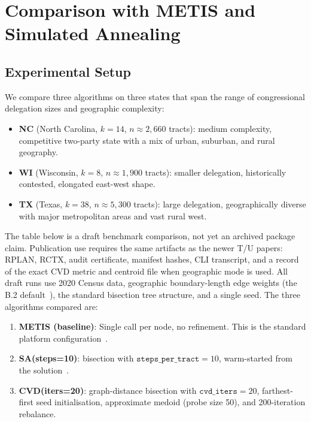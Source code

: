 \section{Comparison with METIS and Simulated Annealing}
\label{sec:comparison}

\subsection{Experimental Setup}

We compare three algorithms on three states that span the range of
congressional delegation sizes and geographic complexity:
\begin{itemize}
\item \textbf{NC} (North Carolina, $k=14$, $n \approx 2{,}660$ tracts):
  medium complexity, competitive two-party state with a mix of urban,
  suburban, and rural geography.
\item \textbf{WI} (Wisconsin, $k=8$, $n \approx 1{,}900$ tracts):
  smaller delegation, historically contested, elongated east-west shape.
\item \textbf{TX} (Texas, $k=38$, $n \approx 5{,}300$ tracts):
  large delegation, geographically diverse with major metropolitan areas
  and vast rural west.
\end{itemize}

The table below is a draft benchmark comparison, not yet an archived package
claim.
Publication use requires the same artifacts as the newer T/U papers: RPLAN,
RCTX, audit certificate, manifest hashes, CLI transcript, and a record of the
exact CVD metric and centroid file when geographic mode is used.
All draft runs use 2020 Census data, geographic boundary-length edge weights
(the B.2 default~\citep{b2paper}), the standard bisection tree structure,
and a single seed.
The three algorithms compared are:

\begin{enumerate}
\item \textbf{METIS (baseline)}: Single \metis{} call per node, no refinement.
  This is the standard platform configuration~\citep{karypis1998}.
\item \textbf{SA(steps=10)}: \sa{} bisection with $\mathtt{steps\_per\_tract} = 10$,
  warm-started from the \metis{} solution~\citep{b19paper}.
\item \textbf{CVD(iters=20)}: graph-distance \cvd{} bisection with
  $\mathtt{cvd\_iters} = 20$, farthest-first seed initialisation,
  approximate medoid (probe size 50), and 200-iteration rebalance.
\end{enumerate}

